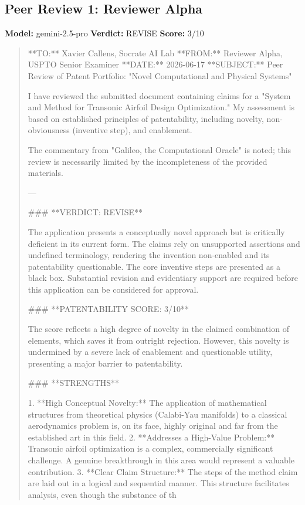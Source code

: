 \documentclass{article}
\begin{document}
\subsection{Peer Review 1: Reviewer Alpha}
\textbf{Model:} gemini-2.5-pro \quad \textbf{Verdict:} REVISE \quad \textbf{Score:} 3/10

\begin{quote}
**TO:** Xavier Callens, Socrate AI Lab
**FROM:** Reviewer Alpha, USPTO Senior Examiner
**DATE:** 2026-06-17
**SUBJECT:** Peer Review of Patent Portfolio: "Novel Computational and Physical Systems"

I have reviewed the submitted document containing claims for a "System and Method for Transonic Airfoil Design Optimization." My assessment is based on established principles of patentability, including novelty, non-obviousness (inventive step), and enablement.

The commentary from "Galileo, the Computational Oracle" is noted; this review is necessarily limited by the incompleteness of the provided materials.

---

\#\#\# **VERDICT: REVISE**

The application presents a conceptually novel approach but is critically deficient in its current form. The claims rely on unsupported assertions and undefined terminology, rendering the invention non-enabled and its patentability questionable. The core inventive steps are presented as a black box. Substantial revision and evidentiary support are required before this application can be considered for approval.

\#\#\# **PATENTABILITY SCORE: 3/10**

The score reflects a high degree of novelty in the claimed combination of elements, which saves it from outright rejection. However, this novelty is undermined by a severe lack of enablement and questionable utility, presenting a major barrier to patentability.

\#\#\# **STRENGTHS**

1.  **High Conceptual Novelty:** The application of mathematical structures from theoretical physics (Calabi-Yau manifolds) to a classical aerodynamics problem is, on its face, highly original and far from the established art in this field.
2.  **Addresses a High-Value Problem:** Transonic airfoil optimization is a complex, commercially significant challenge. A genuine breakthrough in this area would represent a valuable contribution.
3.  **Clear Claim Structure:** The steps of the method claim are laid out in a logical and sequential manner. This structure facilitates analysis, even though the substance of th
\end{quote}
\end{document}

